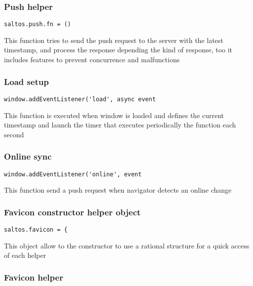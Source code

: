 \documentclass[a4paper]{article}
\begin{document}
\subsubsection{Push helper}

\begin{lstlisting}
saltos.push.fn = ()
\end{lstlisting}

This function tries to send the push request to the server with the latest
timestamp, and process the response depending the kind of response, too it
includes features to prevent concurrence and malfunctions

\hypertarget{toc838}{}
\subsubsection{Load setup}

\begin{lstlisting}
window.addEventListener('load', async event
\end{lstlisting}

This function is executed when window is loaded and defines the current
timestamp and launch the timer that executes periodically the function
each second

\hypertarget{toc839}{}
\subsubsection{Online sync}

\begin{lstlisting}
window.addEventListener('online', event
\end{lstlisting}

This function send a push request when navigator detects an online change

\hypertarget{toc840}{}
\subsubsection{Favicon constructor helper object}

\begin{lstlisting}
saltos.favicon = {
\end{lstlisting}

This object allow to the constructor to use a rational structure for a quick access of each
helper

\hypertarget{toc841}{}
\subsubsection{Favicon helper}
\end{document}
